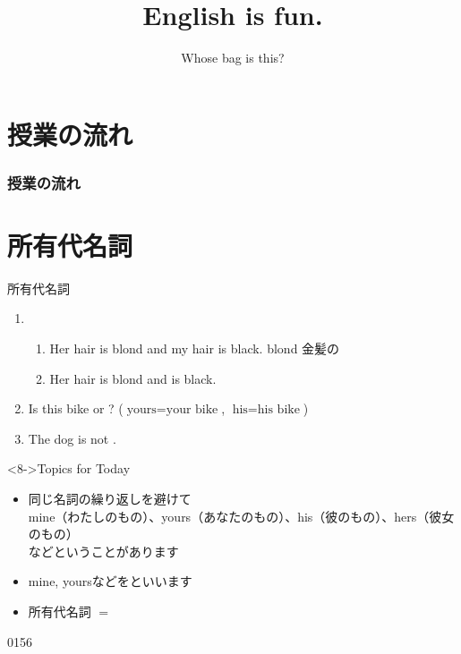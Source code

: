 \documentclass[aspectratio=169,xcolor={dvipsnames,table}]{beamer}
\title{English is fun.}
\subtitle{Whose bag is this?}
\author{}
\institute[]{}
\date[]
\begin{document}
\begin{frame}[plain]
  \titlepage
\end{frame}

\section*{授業の流れ}
\begin{frame}[plain]
  \frametitle{授業の流れ}
  \tableofcontents
\end{frame}
\section{所有代名詞}
\begin{frame}[plain]{所有代名詞}
 
\begin{enumerate}
 \item<1-> \begin{enumerate}
	\item<1-> Her hair is blond and my hair is black.%
\hfill{}{\scriptsize blond  金髪の}
	\item<2-> Her hair is blond and  is black. \visible<3->{($\text{mine} = \text{my hair}$)}
       \end{enumerate}
 \item<4-> Is this bike  or ?  {($\text{yours} = \text{your bike}$, $\text{his} = \text{his bike}$)}
 \item<6-> The dog is not . 
\end{enumerate}

\vfill

\begin{block}<8->{Topics for Today}
\pause
\begin{itemize}[square]\small
 \item 同じ名詞の繰り返しを避けて\\
mine（わたしのもの）、yours（あなたのもの）、his（彼のもの）、hers（彼女のもの）\\
などということがあります
 \item mine, yoursなどをといいます
\item 所有代名詞 $=$ 
\end{itemize}
     \end{block}

\hfill{\tiny 0156}\,{\scriptsize {}}

\end{frame}
\end{document}
